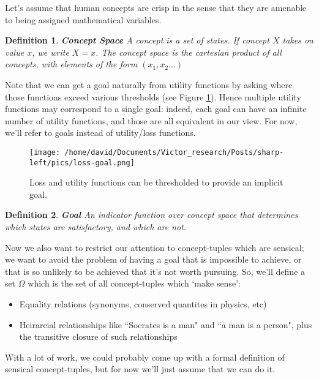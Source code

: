 \documentclass{article}
\newtheorem{definition}{Definition}
\begin{document}
Let's assume that human concepts are crisp in the sense that they are amenable to being assigned mathematical variables.

\begin{definition}{\textbf{Concept Space}}
    A concept is a set of states. If concept $X$ takes on value $x$, we write $X=x$.
    The concept space is the cartesian product of all concepts, with elements of the form $(x_1,x_2\dots)$
\end{definition}

Note that we can get a goal naturally from utility functions by asking where those functions exceed various thresholds (see Figure \ref{fig:loss-goal}). Hence multiple utility functions may correspond to a single goal: indeed, each goal can have an infinite number of utility functions, and those are all equivalent in our view. For now, we'll refer to goals instead of utility/loss functions.

\begin{figure}[ht]
    \centering
    \texttt{[image: /home/david/Documents/Victor\_research/Posts/sharp-left/pics/loss-goal.png]} 
    \caption{Loss and utility functions can be thresholded to provide an implicit goal.}
    \label{fig:loss-goal} 
\end{figure}

\begin{definition}{\textbf{Goal}}
    An indicator function over concept space that determines which states are satisfactory, and which are not.
\end{definition}

Now we also want to restrict our attention to concept-tuples which are sensical; we want to avoid the problem of having a goal that is impossible to achieve, or that is so unlikely to be achieved that it's not worth pursuing. So, we'll define a set $\Omega$ which is the set of all concept-tuples which `make sense':
\begin{itemize}
    \item Equality relations (synonyms, conserved quantites in physics, etc)
    \item Heirarcial relationships like ``Socrates is a man" and ``a man is a person", plus the transitive closure of such relationships
\end{itemize}

With a lot of work, we could probably come up with a formal definition of sensical concept-tuples, but for now we'll just assume that we can do it.
\end{document}
